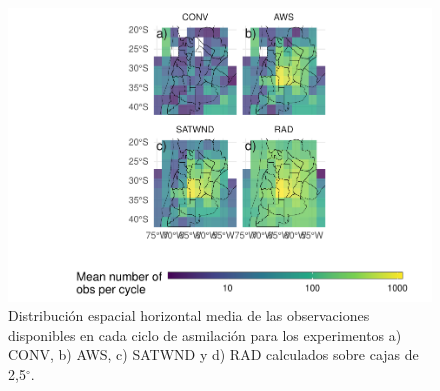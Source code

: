 \documentclass[12pt,oneside,a4paper]{reedthesis}
\begin{document}
\begin{figure}
\includegraphics{thesis_files/figure-latex/obs-horizontal-1} \caption{Distribución espacial horizontal media de las observaciones disponibles en cada ciclo de asmilación para los experimentos a) CONV, b) AWS, c) SATWND y d) RAD calculados sobre cajas de 2,5\(^{\circ}\).}\label{fig:obs-horizontal}
\end{figure}
\end{document}
